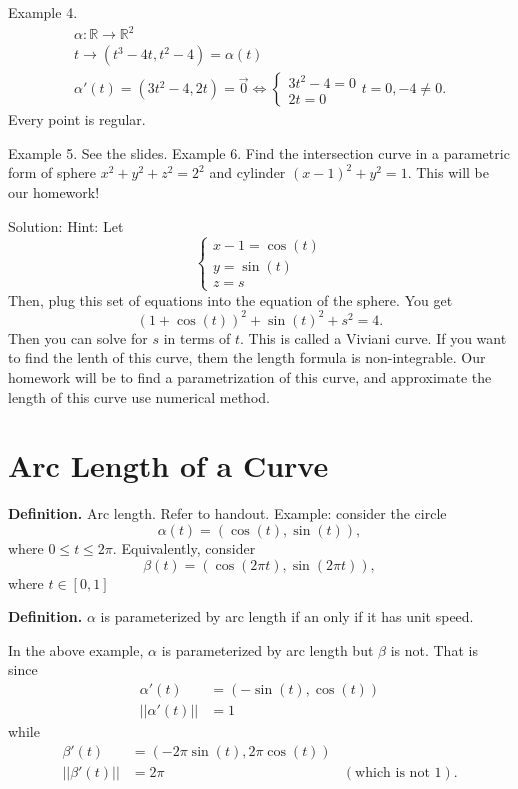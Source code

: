 \documentclass{article}
\begin{document}
Example 4.
\begin{align*}
    \alpha \colon \mathbb{R} \to \mathbb{R}^2 \\
    t \to (t^3 - 4t, t^2 - 4) = \alpha(t)\\
    \alpha'(t) = (3t^2-4, 2t) = \vec{0} \Longleftrightarrow
        \begin{cases}
            3t^2-4 = 0\\
            2t = 0
    \end{cases}
    t=0, -4 \ne 0.
\end{align*}
Every point is regular.

Example 5. See the slides.
Example 6.
Find the intersection curve in a parametric form of sphere $x^2 + y^2 + z^2 = 2^2$ and cylinder $(x - 1)^2 + y^2 = 1.$
This will be our homework!

Solution:
Hint: Let
\[
\begin{cases}
        x-1 = \cos(t) \\
        y = \sin(t) \\
        z = s
\end{cases}
\]
Then, plug this set of equations into the equation of the sphere. You get
\[
(1 + \cos(t))^2 + \sin(t)^2 + s^2 = 4.
\]
Then you can solve for $s$ in terms of $t$. This is called a Viviani curve. If you want to find the lenth of this curve, them the length formula is non-integrable. Our homework will be to find a parametrization of this curve, and approximate the length of this curve use numerical method.

\section{Arc Length of a Curve}
\textbf{Definition.} Arc length. Refer to handout.
Example: consider the circle
$$\alpha(t) = (\cos(t), \sin(t)),$$
where $0 \le t \le 2\pi$. Equivalently, consider 
$$\beta(t) = (\cos(2\pi t), \sin(2 \pi t)),$$ where $t \in [0, 1]$

\textbf{Definition.} $\alpha$ is parameterized by arc length if an only if it has unit speed.

In the above example, $\alpha$ is parameterized by arc length but $\beta$ is not.  That is since 
\begin{align*}
    \alpha'(t) &= (-\sin(t), \cos(t))\\
    ||\alpha'(t)|| &= 1
\end{align*}
while
\begin{align*}
    \beta'(t) &= (-2 \pi \sin(t), 2 \pi \cos(t))\\
    ||\beta'(t)|| &= 2\pi &(\text{which is not 1}).
\end{align*}
\end{document}
